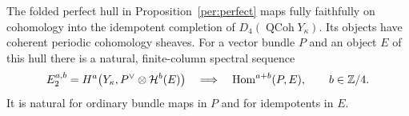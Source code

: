 \begin{lemma}
\label{per:coherent}
The folded perfect hull in Proposition~\ref{per:perfect} maps fully
faithfully on cohomology into the idempotent completion of
$D_4(\operatorname{QCoh}Y_\kappa)$.  Its objects have coherent
periodic cohomology sheaves.  For a vector bundle $P$ and an object
$E$ of this hull there is a natural, finite-column spectral sequence
\begin{equation}
 E_2^{a,b}
   =H^a\bigl(Y_\kappa,P^\vee\otimes\mathcal H^b(E)\bigr)
   \quad\Longrightarrow\quad \operatorname{Hom}^{a+b}(P,E),
 \qquad b\in\mathbb Z/4.
 \label{per:spectral-sequence}
\end{equation}
It is natural for ordinary bundle maps in $P$ and for idempotents
in $E$.
\end{lemma}

